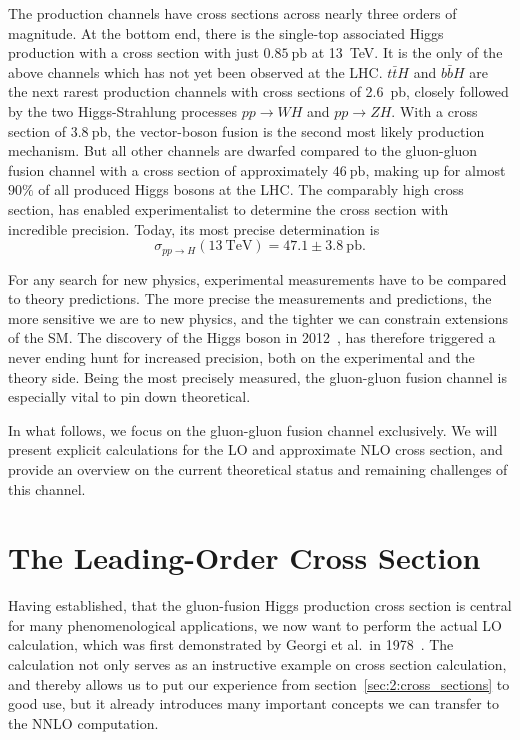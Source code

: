 The production channels have cross sections across nearly three orders of magnitude. At the bottom end, there is the single-top associated Higgs production with a cross section with just $0.85\ \text{pb}$ at 13~TeV. It is the only of the above channels which has not yet been observed at the \acs{LHC}. $t\bar{t}H$ and $b \bar{b}H$ are the next rarest production channels with cross sections of 2.6~pb, closely followed by the two Higgs-Strahlung processes $pp \rightarrow WH$ and $pp \rightarrow ZH$. With a cross section of $3.8\ \mathrm{pb}$, the vector-boson fusion is the second most likely production mechanism. But all other channels are dwarfed compared to the gluon-gluon fusion channel with a cross section of approximately $46\ \mathrm{pb}$, making up for almost $90\%$ of all produced Higgs bosons at the \acs{LHC}. The comparably high cross section, has enabled experimentalist to determine the cross section with incredible precision. Today, its most precise determination is~\cite{CMS:2022dwd}
\begin{equation}
\sigma_{pp \rightarrow H} (13\ \mathrm{TeV}) = 47.1 \pm 3.8 \ \mathrm{pb}.
\end{equation}

For any search for new physics, experimental measurements have to be compared to theory predictions. The more precise the measurements and predictions, the more sensitive we are to new physics, and the tighter we can constrain extensions of the \acs{SM}. The discovery of the Higgs boson in 2012~\cite{ATLAS:2012yve, CMS:2012qbp}, has therefore triggered a never ending hunt for increased precision, both on the experimental and the theory side. Being the most precisely measured, the gluon-gluon fusion channel is especially vital to pin down theoretical.

In what follows, we focus on the gluon-gluon fusion channel exclusively. We will present explicit calculations for the \acs{LO} and approximate \acs{NLO} cross section, and provide an overview on the current theoretical status and remaining challenges of this channel.

\section{The Leading-Order Cross Section} \label{sec:4:LO_xSec}
Having established, that the gluon-fusion Higgs production cross section is central for many phenomenological applications, we now want to perform the actual \acs{LO} calculation, which was first demonstrated by Georgi et al.\ in 1978~\cite{Georgi:1977gs}. The calculation not only serves as an instructive example on cross section calculation, and thereby allows us to put our experience from section~\ref{sec:2:cross_sections} to good use, but it already introduces many important concepts we can transfer to the \acs{NNLO} computation.

